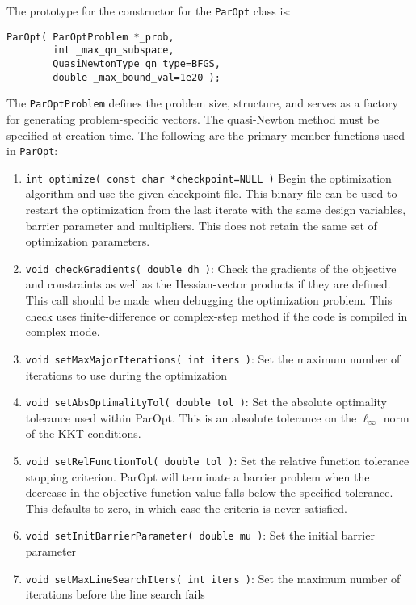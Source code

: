 \documentclass[12pt]{article}
\begin{document}
The prototype for the constructor for the \texttt{ParOpt} class is:
%
\begin{verbatim}
ParOpt( ParOptProblem *_prob,
        int _max_qn_subspace,
        QuasiNewtonType qn_type=BFGS,
        double _max_bound_val=1e20 );
\end{verbatim}
%
The \texttt{ParOptProblem} defines the problem size, structure, and serves as a factory for generating problem-specific vectors.
The quasi-Newton method must be specified at creation time.
The following are the primary member functions used in \texttt{ParOpt}:
\begin{enumerate}
\item \texttt{int optimize( const char *checkpoint=NULL )} Begin the optimization algorithm and use the given checkpoint file. This binary file can be used to restart the optimization from the last iterate with the same design variables, barrier parameter and multipliers. This does not retain the same set of optimization parameters.

\item \texttt{void checkGradients( double dh )}: Check the gradients of the objective and constraints as well as the Hessian-vector products if they are defined. This call should be made when debugging the optimization problem. This check uses finite-difference or complex-step method if the code is compiled in complex mode.

\item \texttt{void setMaxMajorIterations( int iters )}: Set the maximum number of iterations to use during the optimization

\item \texttt{void setAbsOptimalityTol( double tol )}: Set the absolute optimality tolerance used within ParOpt. This is an absolute tolerance on the $\ell_{\infty}$ norm of the KKT conditions.

\item \texttt{void setRelFunctionTol( double tol )}: Set the relative function tolerance stopping criterion. ParOpt will terminate a barrier problem when the decrease in the objective function value falls below the specified tolerance. This defaults to zero, in which case the criteria is never satisfied.

\item \texttt{void setInitBarrierParameter( double mu )}: Set the initial barrier parameter

\item \texttt{void setMaxLineSearchIters( int iters )}: Set the maximum number of iterations before the line search fails


\end{enumerate}
\end{document}
